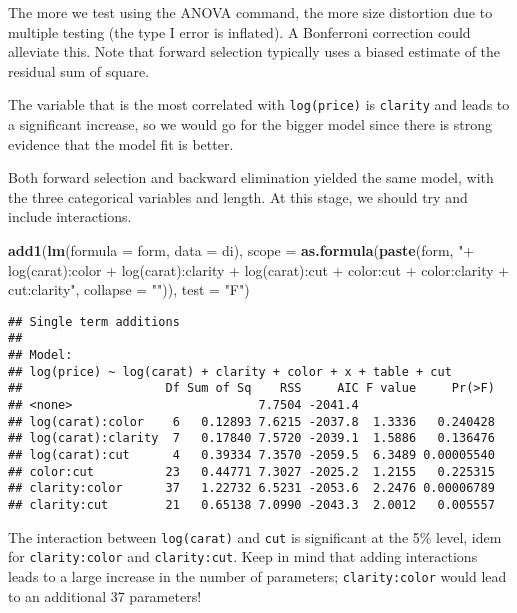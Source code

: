 \documentclass[]{book}
\newenvironment{Shaded}{\begin{snugshade}}{\end{snugshade}}
\newcommand{\DataTypeTok}[1]{\textcolor[rgb]{0.13,0.29,0.53}{#1}}
\newcommand{\KeywordTok}[1]{\textcolor[rgb]{0.13,0.29,0.53}{\textbf{#1}}}
\newcommand{\NormalTok}[1]{#1}
\newcommand{\StringTok}[1]{\textcolor[rgb]{0.31,0.60,0.02}{#1}}
\theoremstyle{definition}
\theoremstyle{definition}
\theoremstyle{definition}
\theoremstyle{remark}
\begin{document}
The more we test using the ANOVA command, the more size distortion due
to multiple testing (the type I error is inflated). A Bonferroni
correction could alleviate this. Note that forward selection typically
uses a biased estimate of the residual sum of square.

The variable that is the most correlated with \texttt{log(price)} is
\texttt{clarity} and leads to a significant increase, so we would go for
the bigger model since there is strong evidence that the model fit is
better.

Both forward selection and backward elimination yielded the same model,
with the three categorical variables and length. At this stage, we
should try and include interactions.

\begin{Shaded}
\begin{Highlighting}[]
\KeywordTok{add1}\NormalTok{(}\KeywordTok{lm}\NormalTok{(}\DataTypeTok{formula =}\NormalTok{ form, }\DataTypeTok{data =}\NormalTok{ di),}
        \DataTypeTok{scope =}  \KeywordTok{as.formula}\NormalTok{(}\KeywordTok{paste}\NormalTok{(form, }\StringTok{"+ log(carat):color + log(carat):clarity + }
\StringTok{                                  log(carat):cut + color:cut + color:clarity + cut:clarity"}\NormalTok{, }\DataTypeTok{collapse =} \StringTok{""}\NormalTok{)),}
     \DataTypeTok{test =} \StringTok{"F"}\NormalTok{)}
\end{Highlighting}
\end{Shaded}

\begin{verbatim}
## Single term additions
## 
## Model:
## log(price) ~ log(carat) + clarity + color + x + table + cut
##                    Df Sum of Sq    RSS     AIC F value     Pr(>F)
## <none>                          7.7504 -2041.4                   
## log(carat):color    6   0.12893 7.6215 -2037.8  1.3336   0.240428
## log(carat):clarity  7   0.17840 7.5720 -2039.1  1.5886   0.136476
## log(carat):cut      4   0.39334 7.3570 -2059.5  6.3489 0.00005540
## color:cut          23   0.44771 7.3027 -2025.2  1.2155   0.225315
## clarity:color      37   1.22732 6.5231 -2053.6  2.2476 0.00006789
## clarity:cut        21   0.65138 7.0990 -2043.3  2.0012   0.005557
\end{verbatim}

The interaction between \texttt{log(carat)} and \texttt{cut} is
significant at the 5\% level, idem for \texttt{clarity:color} and
\texttt{clarity:cut}. Keep in mind that adding interactions leads to a
large increase in the number of parameters; \texttt{clarity:color} would
lead to an additional 37 parameters!
\end{document}
